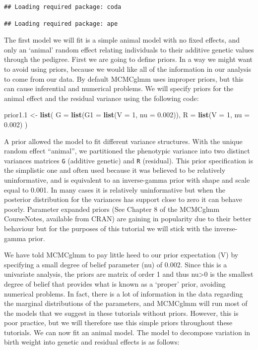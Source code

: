 \documentclass[
  12pt,
]{book}
\newenvironment{Shaded}{\begin{snugshade}}{\end{snugshade}}
\newcommand{\DataTypeTok}[1]{\textcolor[rgb]{0.13,0.29,0.53}{#1}}
\newcommand{\DecValTok}[1]{\textcolor[rgb]{0.00,0.00,0.81}{#1}}
\newcommand{\FloatTok}[1]{\textcolor[rgb]{0.00,0.00,0.81}{#1}}
\newcommand{\KeywordTok}[1]{\textcolor[rgb]{0.13,0.29,0.53}{\textbf{#1}}}
\newcommand{\NormalTok}[1]{#1}
\newcommand{\StringTok}[1]{\textcolor[rgb]{0.31,0.60,0.02}{#1}}
\begin{document}
\begin{verbatim}
## Loading required package: coda
\end{verbatim}

\begin{verbatim}
## Loading required package: ape
\end{verbatim}

The first model we will fit is a simple animal model with no fixed effects, and only an `animal' random effect relating individuals to their additive genetic values through the pedigree.
First we are going to define priors. In a way we might want to avoid using priors, because we would like all of the information in our analysis to come from our data.
By default MCMCglmm uses improper priors, but this can cause inferential and numerical problems. We will specify priors for the animal effect and the residual variance using the following code:

\begin{Shaded}
\begin{Highlighting}[]
\NormalTok{prior1}\FloatTok{.1}\NormalTok{ \textless{}{-}}\StringTok{ }\KeywordTok{list}\NormalTok{(}
  \DataTypeTok{G =} \KeywordTok{list}\NormalTok{(}\DataTypeTok{G1 =} \KeywordTok{list}\NormalTok{(}\DataTypeTok{V =} \DecValTok{1}\NormalTok{, }\DataTypeTok{nu =} \FloatTok{0.002}\NormalTok{)),}
  \DataTypeTok{R =} \KeywordTok{list}\NormalTok{(}\DataTypeTok{V =} \DecValTok{1}\NormalTok{, }\DataTypeTok{nu =} \FloatTok{0.002}\NormalTok{)}
\NormalTok{)}
\end{Highlighting}
\end{Shaded}

A prior allowed the model to fit different variance structures. With the unique random effect ``animal'', we partitioned the phenotypic variance into two distinct variances matrices \texttt{G} (additive genetic) and \texttt{R} (residual).
This prior specification is the simplistic one and often used because it was believed to be relatively uninformative, and is equivalent to an inverse-gamma prior with shape and scale equal to 0.001. In many cases it is relatively uninformative but when the posterior distribution for the variances has support close to zero it can behave poorly. Parameter expanded priors (See Chapter 8 of the MCMCglmm CourseNotes, available from CRAN) are gaining in popularity due to their better behaviour but for the purposes of this tutorial we will stick with the inverse-gamma prior.

We have told MCMCglmm to pay little heed to our prior expectation (V) by specifying a small degree of belief parameter (nu) of 0.002. Since this is a univariate analysis, the priors are matrix of order 1 and thus nu\textgreater0 is the smallest degree of belief that provides what is known as a `proper' prior, avoiding numerical problems. In fact, there is a lot of information in the data regarding the marginal distributions of the parameters, and MCMCglmm will run most of the models that we suggest in these tutorials without priors. However, this is poor practice, but we will therefore use this simple priors throughout these tutorials. We can now fit an animal model. The model to decompose variation in birth weight into genetic and residual effects is as follows:
\end{document}
